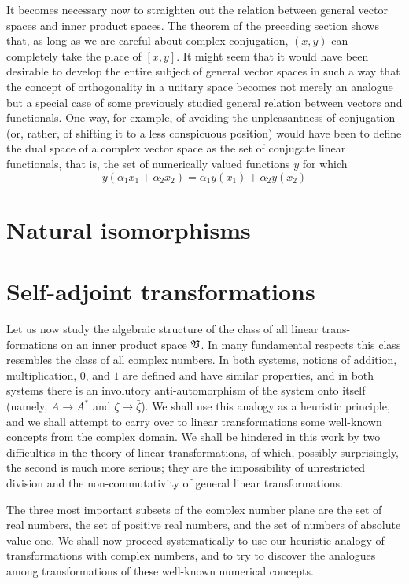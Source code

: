 It becomes necessary now to straighten out the relation between general vector
spaces and inner product spaces. The theorem of the preceding section shows
that, as long as we are careful about complex conjugation, \((x, y)\) can
completely take the place of \([x, y]\). It might seem that it would have been
desirable to develop the entire subject of general vector spaces in such a way
that the concept of orthogonality in a unitary space becomes not merely an
analogue but a special case of some previously studied general relation between
vectors and functionals. One way, for example, of avoiding the unpleasantness of
conjugation (or, rather, of shifting it to a less conspicuous position) would
have been to define the dual space of a complex vector space as the set of
conjugate linear functionals, that is, the set of numerically valued functions
\(y\) for which
\begin{equation*}
    y(\alpha_1 x_1 + \alpha_2 x_2) = \bar{\alpha_1} y(x_1) + \bar{\alpha_2} y(x_2)
\end{equation*}


\section{Natural isomorphisms}

\section{Self-adjoint transformations}

Let us now study the algebraic structure of the class of all linear trans-
formations on an inner product space \(\mathfrak{V}\). In many fundamental respects
this class resembles the class of all complex numbers. In both systems, notions
of addition, multiplication, \(0\), and \(1\) are defined and have similar
properties, and in both systems there is an involutory anti-automorphism of the
system onto itself (namely, \(A \to A^*\) and \(\zeta \to \bar{\zeta}\)). We
shall use this analogy as a heuristic principle, and we shall attempt to carry
over to linear transformations some well-known concepts from the complex domain.
We shall be hindered in this work by two difficulties in the theory of linear
transformations, of which, possibly surprisingly, the second is much more
serious; they are the impossibility of unrestricted division and the
non-commutativity of general linear transformations.

The three most important subsets of the complex number plane are the
set of real numbers, the set of positive real numbers, and the set of numbers of absolute value one. We shall now proceed systematically to use our heuristic analogy of transformations with complex numbers, and to try to discover the analogues among transformations of these well-known numerical concepts.

